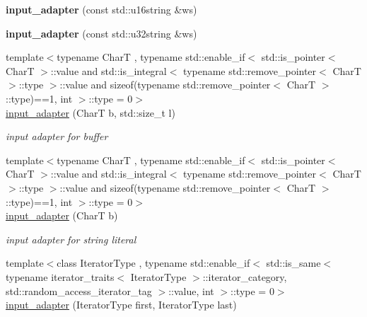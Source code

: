 \begin{DoxyCompactItemize}
{\bfseries input\+\_\+adapter} (const std\+::u16string \&ws)
\item 
\mbox{\label{classnlohmann_1_1detail_1_1input__adapter_abe0015ae09e855f502620315b9dcc3db}} 
{\bfseries input\+\_\+adapter} (const std\+::u32string \&ws)
\item 
\mbox{\label{classnlohmann_1_1detail_1_1input__adapter_a37816622d79ab4a1a76f4d7e872b65e1}} 
{\footnotesize template$<$typename CharT , typename std\+::enable\+\_\+if$<$ std\+::is\+\_\+pointer$<$ Char\+T $>$\+::value and std\+::is\+\_\+integral$<$ typename std\+::remove\+\_\+pointer$<$ Char\+T $>$\+::type $>$\+::value and sizeof(typename std\+::remove\+\_\+pointer$<$ Char\+T $>$\+::type)==1, int $>$\+::type  = 0$>$ }\\\mbox{\hyperlink{classnlohmann_1_1detail_1_1input__adapter_a37816622d79ab4a1a76f4d7e872b65e1}{input\+\_\+adapter}} (CharT b, std\+::size\+\_\+t l)
\begin{DoxyCompactList}\small\item\em input adapter for buffer \end{DoxyCompactList}\item 
\mbox{\label{classnlohmann_1_1detail_1_1input__adapter_a86f035d9c4319360014b922b5e433ced}} 
{\footnotesize template$<$typename CharT , typename std\+::enable\+\_\+if$<$ std\+::is\+\_\+pointer$<$ Char\+T $>$\+::value and std\+::is\+\_\+integral$<$ typename std\+::remove\+\_\+pointer$<$ Char\+T $>$\+::type $>$\+::value and sizeof(typename std\+::remove\+\_\+pointer$<$ Char\+T $>$\+::type)==1, int $>$\+::type  = 0$>$ }\\\mbox{\hyperlink{classnlohmann_1_1detail_1_1input__adapter_a86f035d9c4319360014b922b5e433ced}{input\+\_\+adapter}} (CharT b)
\begin{DoxyCompactList}\small\item\em input adapter for string literal \end{DoxyCompactList}\item 
\mbox{\label{classnlohmann_1_1detail_1_1input__adapter_ad6824b0f792691f75186c527fa31a6b4}} 
{\footnotesize template$<$class Iterator\+Type , typename std\+::enable\+\_\+if$<$ std\+::is\+\_\+same$<$ typename iterator\+\_\+traits$<$ Iterator\+Type $>$\+::iterator\+\_\+category, std\+::random\+\_\+access\+\_\+iterator\+\_\+tag $>$\+::value, int $>$\+::type  = 0$>$ }\\\mbox{\hyperlink{classnlohmann_1_1detail_1_1input__adapter_ad6824b0f792691f75186c527fa31a6b4}{input\+\_\+adapter}} (Iterator\+Type first, Iterator\+Type last)

\end{DoxyCompactItemize}
